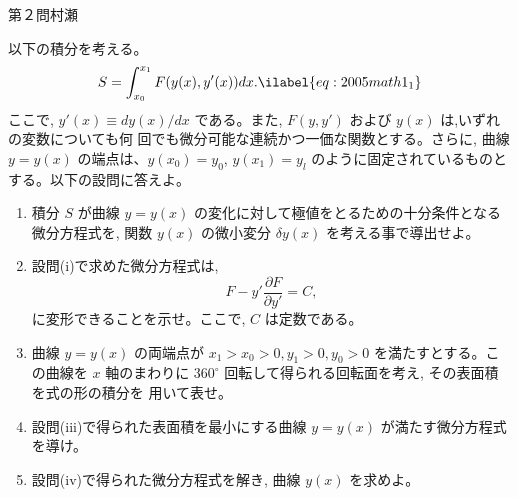 \begin{question}{第２問}{村瀬}

以下の積分を考える。
\begin{equation}
S=\int_{x_0}^{x_1}F(y(x),y'(x))dx. \ilabel{eq:2005math1_1}
\end{equation}
ここで, $y'(x)\equiv dy(x)/dx$ である。また, $F(y,y')$ および $y(x)$ は,いずれの変数についても何
回でも微分可能な連続かつ一価な関数とする。さらに, 曲線 $y=y(x)$ の端点は、$y(x_0)=y_0$,
$y(x_1)=y_l$ のように固定されているものとする。以下の設問に答えよ。
\begin{enumerate}
\item 
  積分 $S$ が曲線 $y=y(x)$ の変化に対して極値をとるための十分条件となる微分方程式を,
  関数 $y(x)$ の微小変分 $\delta y(x)$ を考える事で導出せよ。
\item 
  設問(i)で求めた微分方程式は,
  \[F-y'\frac{\partial F}{\partial y'}=C,\]
  に変形できることを示せ。ここで, $C$ は定数である。
\item 
  曲線 $y=y(x)$ の両端点が $x_1>x_0>0, y_1>0, y_0>0$ を満たすとする。この曲線を $x$
  軸のまわりに $360^\circ$ 回転して得られる回転面を考え, その表面積を式の形の積分を
  用いて表せ。
\item 
  設問(iii)で得られた表面積を最小にする曲線 $y=y(x)$ が満たす微分方程式を導け。
\item 
  設問(iv)で得られた微分方程式を解き, 曲線 $y(x)$ を求めよ。
\end{enumerate}
\end{question}
